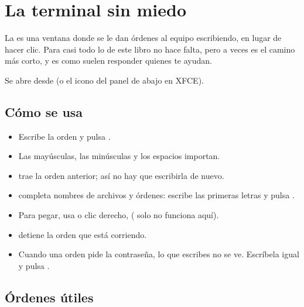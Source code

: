 \chapter{La terminal sin miedo}\label{cap:18-terminal}

La  es una ventana donde se le dan órdenes al equipo
escribiendo, en lugar de hacer clic. Para casi todo lo de este libro no
hace falta, pero a veces es el camino más corto, y es como suelen
responder quienes te ayudan.

Se abre desde  (o el icono del
panel de abajo en XFCE).


\section{Cómo se usa}

\begin{itemize}
  \item Escribe la orden y pulsa .
  \item Las mayúsculas, las minúsculas y los espacios importan.
  \item \keys{\arrowkeyup} trae la orden anterior; así no hay que escribirla
        de nuevo.
  \item {} completa nombres de archivos y órdenes: escribe las
        primeras letras y pulsa .
  \item Para pegar, usa  o clic derecho,
         ( solo no funciona aquí).
  \item {} detiene la orden que está corriendo.
  \item Cuando una orden pide la contraseña, lo que escribes no se ve.
        Escríbela igual y pulsa .
\end{itemize}

\section{Órdenes útiles}

